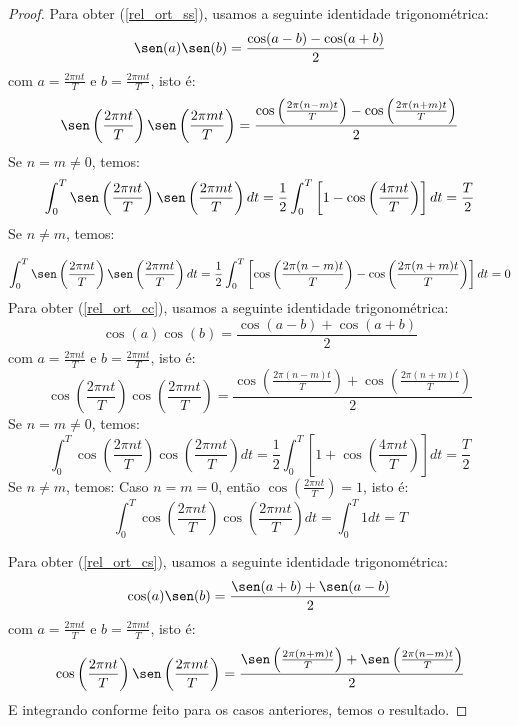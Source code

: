 \begin{proof}
 Para obter (\ref{rel_ort_ss}), usamos a seguinte identidade trigonométrica:
 $$\sen(a)\sen(b)=\frac{\cos(a-b)-\cos(a+b)}{2}$$
com $a=\frac{2\pi nt}{T}$ e $b=\frac{2\pi mt}{T}$, isto é:
 $$\sen\left(\frac{2\pi nt}{T}\right)\sen\left(\frac{2\pi mt}{T}\right)=\frac{\cos\left(\frac{2\pi (n-m)t}{T}\right)-\cos\left(\frac{2\pi (n+m)t}{T}\right)}{2}$$
Se $n=m\neq 0$, temos:
 $$\int_0^T\sen\left(\frac{2\pi nt}{T}\right)\sen\left(\frac{2\pi mt}{T}\right)dt=\frac{1}{2}\int_0^T\left[1-\cos\left(\frac{4\pi nt}{T}\right)\right]dt=\frac{T}{2}$$
 Se $n\neq m$, temos:
 
 $$\int_0^T\sen\left(\frac{2\pi nt}{T}\right)\sen\left(\frac{2\pi mt}{T}\right)dt=\frac{1}{2}\int_0^T\left[\cos\left(\frac{2\pi (n-m)t}{T}\right)-\cos\left(\frac{2\pi (n+m)t}{T}\right)\right]dt=0$$
 Para obter (\ref{rel_ort_cc}), usamos a seguinte identidade trigonométrica:
 $$\cos(a)\cos(b)=\frac{\cos(a-b)+\cos(a+b)}{2}$$
com $a=\frac{2\pi nt}{T}$ e $b=\frac{2\pi mt}{T}$, isto é:
 $$\cos\left(\frac{2\pi nt}{T}\right)\cos\left(\frac{2\pi mt}{T}\right)=\frac{\cos\left(\frac{2\pi (n-m)t}{T}\right)+\cos\left(\frac{2\pi (n+m)t}{T}\right)}{2}$$
 Se $n=m\neq 0$, temos:
 $$\int_0^T\cos\left(\frac{2\pi nt}{T}\right)\cos\left(\frac{2\pi mt}{T}\right)dt=\frac{1}{2}\int_0^T\left[1+\cos\left(\frac{4\pi nt}{T}\right)\right]dt=\frac{T}{2}$$
 Se $n\neq m$, temos:
Caso $n=m= 0$, então $\cos\left(\frac{2\pi nt}{T}\right)=1$, isto é:
$$\int_0^T\cos\left(\frac{2\pi nt}{T}\right)\cos\left(\frac{2\pi mt}{T}\right)dt=\int_0^T 1dt=T$$

 Para obter (\ref{rel_ort_cs}), usamos a seguinte identidade trigonométrica:
$$\cos(a)\sen(b)=\frac{\sen(a+b)+\sen(a-b)}{2}$$ 
com $a=\frac{2\pi nt}{T}$ e $b=\frac{2\pi mt}{T}$, isto é:
 $$\cos\left(\frac{2\pi nt}{T}\right)\sen\left(\frac{2\pi mt}{T}\right)=\frac{\sen\left(\frac{2\pi (n+m)t}{T}\right)+\sen\left(\frac{2\pi (n-m)t}{T}\right)}{2}$$
E integrando conforme feito para os casos anteriores, temos o resultado.
 \end{proof}

